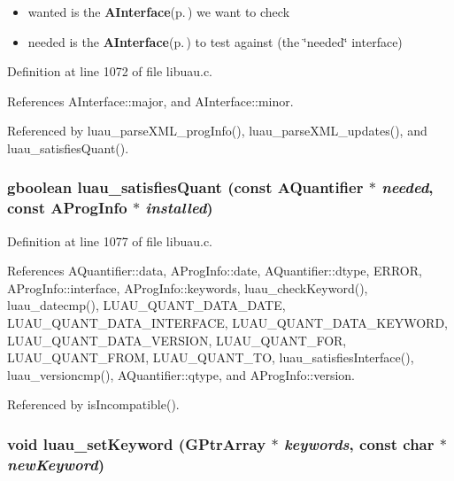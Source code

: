 \begin{itemize}
\item wanted is the {\bf AInterface}{\rm (p.\,\pageref{structAInterface})} we want to check \item needed is the {\bf AInterface}{\rm (p.\,\pageref{structAInterface})} to test against (the \char`\"{}needed\char`\"{} interface) 
\end{itemize}


Definition at line 1072 of file libuau.c.

References AInterface::major, and AInterface::minor.

Referenced by luau\_\-parse\-XML\_\-prog\-Info(), luau\_\-parse\-XML\_\-updates(), and luau\_\-satisfies\-Quant().
\subsubsection{\setlength{\rightskip}{0pt plus 5cm}gboolean luau\_\-satisfies\-Quant (const {\bf AQuantifier} $\ast$ {\em needed}, const {\bf AProg\-Info} $\ast$ {\em installed})}\label{libuau_8h_a86}




Definition at line 1077 of file libuau.c.

References AQuantifier::data, AProg\-Info::date, AQuantifier::dtype, ERROR, AProg\-Info::interface, AProg\-Info::keywords, luau\_\-check\-Keyword(), luau\_\-datecmp(), LUAU\_\-QUANT\_\-DATA\_\-DATE, LUAU\_\-QUANT\_\-DATA\_\-INTERFACE, LUAU\_\-QUANT\_\-DATA\_\-KEYWORD, LUAU\_\-QUANT\_\-DATA\_\-VERSION, LUAU\_\-QUANT\_\-FOR, LUAU\_\-QUANT\_\-FROM, LUAU\_\-QUANT\_\-TO, luau\_\-satisfies\-Interface(), luau\_\-versioncmp(), AQuantifier::qtype, and AProg\-Info::version.

Referenced by is\-Incompatible().
\subsubsection{\setlength{\rightskip}{0pt plus 5cm}void luau\_\-set\-Keyword (GPtr\-Array $\ast$ {\em keywords}, const char $\ast$ {\em new\-Keyword})}\label{libuau_8h_a78}


